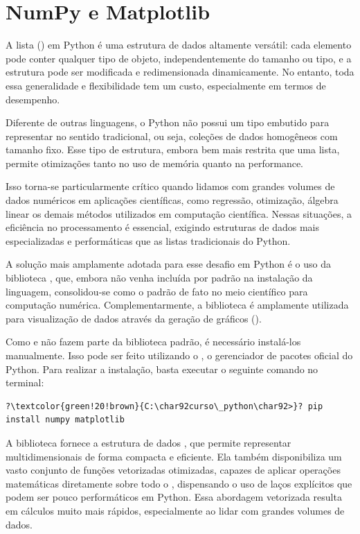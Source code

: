 \chapter{NumPy e Matplotlib}\label{numpy}

A lista () em Python é uma estrutura de dados altamente versátil: cada elemento pode conter qualquer tipo
de objeto, independentemente do tamanho ou tipo, e a estrutura pode ser modificada e redimensionada dinamicamente.
No entanto, toda essa generalidade e flexibilidade tem um custo, especialmente em termos de desempenho.

Diferente de outras linguagens, o Python não possui um tipo embutido para representar  no sentido
tradicional, ou seja, coleções de dados homogêneos com tamanho fixo.
Esse tipo de estrutura, embora bem mais restrita que uma lista, permite otimizações tanto no uso de memória quanto
na performance.

Isso torna-se particularmente crítico quando lidamos com grandes volumes de dados numéricos em aplicações
científicas, como regressão, otimização, álgebra linear os demais métodos utilizados em
computação científica.
Nessas situações, a eficiência no processamento é essencial, exigindo estruturas de dados mais especializadas e
performáticas que as listas tradicionais do Python.

A solução mais amplamente adotada para esse desafio em Python é o uso da biblioteca , que, embora não
venha incluída por padrão na instalação da linguagem, consolidou-se como o padrão de fato no meio científico para
computação numérica.
Complementarmente, a biblioteca  é amplamente utilizada para visualização de dados através da
geração de gráficos ().


Como  e  não fazem parte da biblioteca padrão, é necessário instalá-los manualmente.
Isso pode ser feito utilizando o , o gerenciador de pacotes oficial do Python.
Para realizar a instalação, basta executar o seguinte comando no terminal:
\begin{verbatim}
?\textcolor{green!20!brown}{C:\char92curso\_python\char92>}? pip install numpy matplotlib
\end{verbatim}

A biblioteca  fornece a estrutura de dados , que permite representar
 multidimensionais de forma compacta e eficiente.
Ela também disponibiliza um vasto conjunto de funções vetorizadas otimizadas, capazes de aplicar operações matemáticas
diretamente sobre todo o , dispensando o uso de laços explícitos que podem ser pouco performáticos em Python.
Essa abordagem vetorizada resulta em cálculos muito mais rápidos, especialmente ao lidar com grandes volumes de dados.

